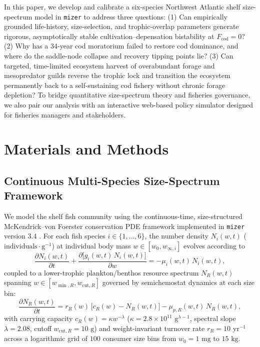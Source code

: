 \documentclass[11pt,letterpaper]{article}
\begin{document}
In this paper, we develop and calibrate a six-species Northwest Atlantic shelf size-spectrum model in \texttt{mizer} \citep{scott2014mizer,delius2022mizer} to address three questions: (1) Can empirically grounded life-history, size-selection, and trophic-overlap parameters generate rigorous, asymptotically stable cultivation--depensation bistability at $F_{\mathrm{cod}} = 0$? (2) Why has a 34-year cod moratorium failed to restore cod dominance, and where do the saddle-node collapse and recovery tipping points lie? (3) Can targeted, time-limited ecosystem harvest of overabundant forage and mesopredator guilds reverse the trophic lock and transition the ecosystem permanently back to a self-sustaining cod fishery without chronic forage depletion? To bridge quantitative size-spectrum theory and fisheries governance, we also pair our analysis with an interactive web-based policy simulator designed for fisheries managers and stakeholders.

\section{Materials and Methods}

\subsection{Continuous Multi-Species Size-Spectrum Framework}

We model the shelf fish community using the continuous-time, size-structured McKendrick--von Foerster conservation PDE framework implemented in \texttt{mizer} version 3.4 \citep{scott2014mizer,andersen2019fish}. For each fish species $i \in \{1,\dots,6\}$, the number density $N_i(w,t)$ ($\text{individuals}\cdot\text{g}^{-1}$) at individual body mass $w \in [w_0, w_{\infty,i}]$ evolves according to
\begin{equation}
  \frac{\partial N_i(w,t)}{\partial t} + \frac{\partial \big[g_i(w,t)\,N_i(w,t)\big]}{\partial w} = -\mu_i(w,t)\,N_i(w,t),
  \label{eq:mvf}
\end{equation}
coupled to a lower-trophic plankton/benthos resource spectrum $N_R(w,t)$ spanning $w \in [w_{\min,R}, w_{\mathrm{cut},R}]$ governed by semichemostat dynamics at each size bin:
\begin{equation}
  \frac{\partial N_R(w,t)}{\partial t} = r_R(w)\,\big[c_R(w) - N_R(w,t)\big] - \mu_{p,R}(w,t)\,N_R(w,t),
  \label{eq:resource}
\end{equation}
with carrying capacity $c_R(w) = \kappa w^{-\lambda}$ ($\kappa = 2.8 \times 10^{11}\text{ g}^{\lambda-1}$, spectral slope $\lambda = 2.08$, cutoff $w_{\mathrm{cut},R} = 10\text{ g}$) and weight-invariant turnover rate $r_R = 10\text{ yr}^{-1}$ across a logarithmic grid of $100$ consumer size bins from $w_0 = 1\text{ mg}$ to $15\text{ kg}$.
\end{document}
